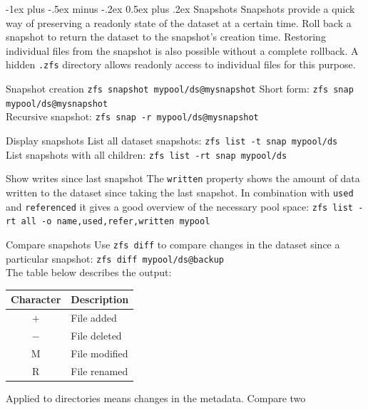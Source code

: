 \documentclass[10pt,landscape,letter]{article}
\makeatletter
\renewcommand{\section}{\@startsection{section}{1}{0mm}%
                                {-1ex plus -.5ex minus -.2ex}%
                                {0.5ex plus .2ex}%
                                {\normalfont\large\bfseries}}
\makeatother
\begin{document}
\begin{multicols}{3}
	\section{Snapshots}
  Snapshots provide a quick way of preserving a readonly state of the dataset
  at a certain time. Roll back a snapshot to return the dataset to the
  snapshot's creation time. Restoring individual files from the snapshot is
  also possible without a complete rollback. A hidden \texttt{.zfs} directory
  allows readonly access to individual files for this purpose.
	\begin{Description}
    \item[Snapshot creation] \texttt{zfs snapshot mypool/ds@mysnapshot}
      Short form: \texttt{zfs snap mypool/ds@mysnapshot}\\
      Recursive snapshot: \texttt{zfs snap -r mypool/ds@mysnapshot}
    \item[Display snapshots] List all dataset snapshots:
      \texttt{zfs list -t snap mypool/ds}\\
      List snapshots with all children:
      \texttt{zfs list -rt snap mypool/ds}
    \item[Show writes since last snapshot] The \texttt{written} property shows
      the amount of data written to the dataset since taking the last snapshot.
      In combination with \texttt{used} and \texttt{referenced} it gives a good
      overview of the necessary pool space: \texttt{zfs list -rt all -o
      name,used,refer,written mypool}
    \item[Compare snapshots] Use \texttt{zfs diff} to compare changes in the
      dataset since a particular snapshot:
		      \texttt{zfs diff mypool/ds@backup}\\
		      The table below describes the output:
		      \begin{center}
			      \begin{tabular}{ c | l }
				      \textbf{Character} & \textbf{Description} \\
				      \hline
				      $+$              & File added\\
				      $-$              & File deleted \\
				      M                & File modified\\
				      R                & File renamed \\
			      \end{tabular}
		      \end{center}
          Applied to directories means changes in the metadata. Compare two

\end{Description}
\end{multicols}
\end{document}
